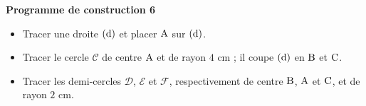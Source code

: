 \documentclass[exercice,a4]{thedocument}%
\begin{document}
%
\noindent\textbf{Programme de construction 6}\par\smallskip\noindent
\begin{itemize}
    \item Tracer une droite $(\text{d})$ et placer
    $\text{A}$ sur $(\text{d})$.
    \item Tracer le cercle $\mathcal{C}$ de centre $\text{A}$ et de
    rayon $4\text{ cm}$ ; il coupe $(\text{d})$ en
    $\text{B}$ et $\text{C}$.
    \item Tracer les demi-cercles $\mathcal{D}$, $\mathcal{E}$ et
    $\mathcal{F}$, respectivement de centre $\text{B}$,
    $\text{A}$ et $\text{C}$, et de rayon $2\text{ cm}$.
\end{itemize}
\end{document}
